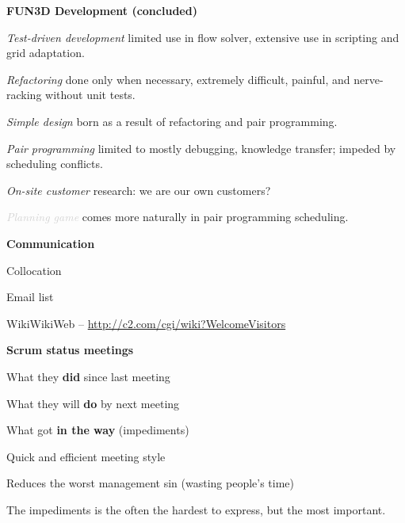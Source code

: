 \documentclass[landscape]{slides}
\renewcommand{\title}[1]{{\large\bfseries #1}}
\newenvironment{itemiz}%
  {\begin{list}{}{\raggedright
      \setlength{\itemsep}{2pt}%
      \setlength{\parskip}{4pt}\setlength{\parsep}{2pt}}}%
  {\end{list}}%
\begin{document}
 \begin{slide}
  \title{FUN3D Development \small(concluded)}
  \begin{itemiz}
    \item[\textcolor{mediumGray}{\textit{Test-driven development}}]
      {\small limited use in flow solver, 
	extensive use in scripting and grid adaptation.}
    \item[\textcolor{mediumGray}{\textit{Refactoring}}]
      {\small done only when necessary, extremely difficult, 
	painful, and nerve-racking without unit tests.}
    \item[\textcolor{mediumGray}{\textit{Simple design}}]
      {\small born as a result of refactoring and pair programming.}
    \item[\textcolor{mediumGray}{\textit{Pair programming}}]
      {\small limited to mostly debugging, knowledge transfer; 
	impeded by scheduling conflicts. }
    \item[\textcolor{mediumGray}{\textit{On-site customer}}]
      {\small research: we are our own customers?}  
    \item[\textcolor{lightGray}{\textit{Planning game}}]
      {\small comes more naturally in pair programming scheduling. }
  \end{itemiz}
 \end{slide}

 \begin{slide}
  \title{Communication}
  \begin{itemiz}
  \item Collocation
  \item Email list
  \item WikiWikiWeb --  \url{http://c2.com/cgi/wiki?WelcomeVisitors}
  \end{itemiz}
  \title{Scrum status meetings}
  \begin{itemiz}
  \item What they {\bf did} since last meeting
  \item What they will {\bf do} by next meeting
  \item What got {\bf in the way} (impediments)
  \end{itemiz}
  \begin{itemiz}
    \item Quick and efficient meeting style
    \item Reduces the worst management sin (wasting people's time)
    \item The impediments is the often the hardest to express, but the
    most important.
  \end{itemiz}
 \end{slide}
 
\end{document}
